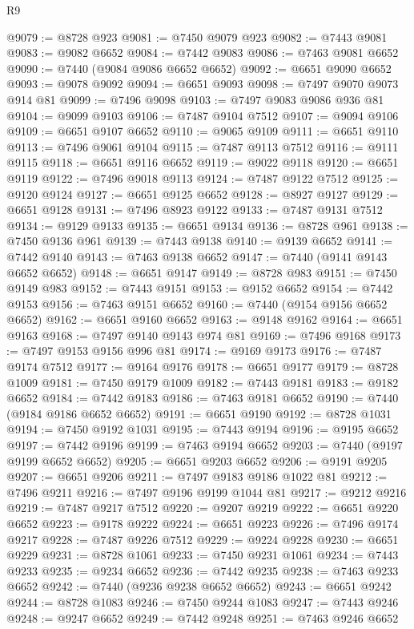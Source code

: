 \begin{lexlean}{R9}
\begin{coremodule}
{{{{{{{{{{{{{{{{{{{{{{{{{{{{{{{{{{{{{{{{{{{{{{{{{{{{{{{{{{{{{{{{{{{{{{{{{{{{{{{{{{{{@9079 := @8728 @923
@9081 := @7450 @9079 @923
@9082 := @7443 @9081
@9083 := @9082 @6652
@9084 := @7442 @9083
@9086 := @7463 @9081 @6652
@9090 := @7440 (@9084 @9086 @6652 @6652)
@9092 := @6651 @9090 @6652
@9093 := @9078 @9092
@9094 := @6651 @9093
@9098 := @7497 @9070 @9073 @914 @81
@9099 := @7496 @9098
@9103 := @7497 @9083 @9086 @936 @81
@9104 := @9099 @9103
@9106 := @7487 @9104 @7512
@9107 := @9094 @9106
@9109 := @6651 @9107 @6652
@9110 := @9065 @9109
@9111 := @6651 @9110
@9113 := @7496 @9061 @9104
@9115 := @7487 @9113 @7512
@9116 := @9111 @9115
@9118 := @6651 @9116 @6652
@9119 := @9022 @9118
@9120 := @6651 @9119
@9122 := @7496 @9018 @9113
@9124 := @7487 @9122 @7512
@9125 := @9120 @9124
@9127 := @6651 @9125 @6652
@9128 := @8927 @9127
@9129 := @6651 @9128
@9131 := @7496 @8923 @9122
@9133 := @7487 @9131 @7512
@9134 := @9129 @9133
@9135 := @6651 @9134
@9136 := @8728 @961
@9138 := @7450 @9136 @961
@9139 := @7443 @9138
@9140 := @9139 @6652
@9141 := @7442 @9140
@9143 := @7463 @9138 @6652
@9147 := @7440 (@9141 @9143 @6652 @6652)
@9148 := @6651 @9147
@9149 := @8728 @983
@9151 := @7450 @9149 @983
@9152 := @7443 @9151
@9153 := @9152 @6652
@9154 := @7442 @9153
@9156 := @7463 @9151 @6652
@9160 := @7440 (@9154 @9156 @6652 @6652)
@9162 := @6651 @9160 @6652
@9163 := @9148 @9162
@9164 := @6651 @9163
@9168 := @7497 @9140 @9143 @974 @81
@9169 := @7496 @9168
@9173 := @7497 @9153 @9156 @996 @81
@9174 := @9169 @9173
@9176 := @7487 @9174 @7512
@9177 := @9164 @9176
@9178 := @6651 @9177
@9179 := @8728 @1009
@9181 := @7450 @9179 @1009
@9182 := @7443 @9181
@9183 := @9182 @6652
@9184 := @7442 @9183
@9186 := @7463 @9181 @6652
@9190 := @7440 (@9184 @9186 @6652 @6652)
@9191 := @6651 @9190
@9192 := @8728 @1031
@9194 := @7450 @9192 @1031
@9195 := @7443 @9194
@9196 := @9195 @6652
@9197 := @7442 @9196
@9199 := @7463 @9194 @6652
@9203 := @7440 (@9197 @9199 @6652 @6652)
@9205 := @6651 @9203 @6652
@9206 := @9191 @9205
@9207 := @6651 @9206
@9211 := @7497 @9183 @9186 @1022 @81
@9212 := @7496 @9211
@9216 := @7497 @9196 @9199 @1044 @81
@9217 := @9212 @9216
@9219 := @7487 @9217 @7512
@9220 := @9207 @9219
@9222 := @6651 @9220 @6652
@9223 := @9178 @9222
@9224 := @6651 @9223
@9226 := @7496 @9174 @9217
@9228 := @7487 @9226 @7512
@9229 := @9224 @9228
@9230 := @6651 @9229
@9231 := @8728 @1061
@9233 := @7450 @9231 @1061
@9234 := @7443 @9233
@9235 := @9234 @6652
@9236 := @7442 @9235
@9238 := @7463 @9233 @6652
@9242 := @7440 (@9236 @9238 @6652 @6652)
@9243 := @6651 @9242
@9244 := @8728 @1083
@9246 := @7450 @9244 @1083
@9247 := @7443 @9246
@9248 := @9247 @6652
@9249 := @7442 @9248
@9251 := @7463 @9246 @6652
}}}}}}}}}}}}}}}}}}}}}}}}}}}}}}}}}}}}}}}}}}}}}}}}}}}}}}}}}}}}}}}}}}}}}}}}}}}}}}}}}}}}
\end{coremodule}
\end{lexlean}
